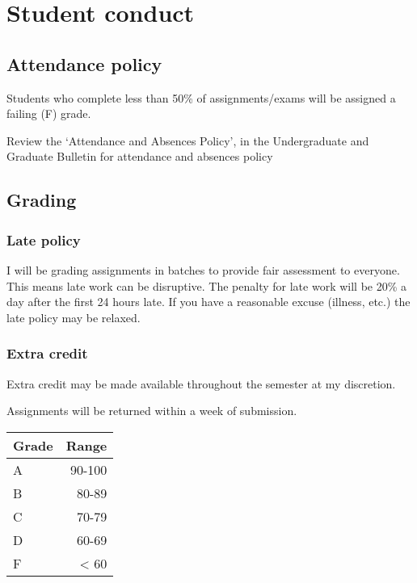 \documentclass[11pt,]{article}
\begin{document}
\newpage

\hypertarget{student-conduct}{%
\section{Student conduct}\label{student-conduct}}

\hypertarget{attendance-policy}{%
\subsection{Attendance policy}\label{attendance-policy}}

Students who complete less than 50\% of assignments/exams will be
assigned a failing (F) grade.

Review the `Attendance and Absences Policy', in the Undergraduate and
Graduate Bulletin for attendance and absences policy

\hypertarget{grading}{%
\subsection{Grading}\label{grading}}

\hypertarget{late-policy}{%
\subsubsection{Late policy}\label{late-policy}}

I will be grading assignments in batches to provide fair assessment to
everyone. This means late work can be disruptive. The penalty for late
work will be 20\% a day after the first 24 hours late. If you have a
reasonable excuse (illness, etc.) the late policy may be relaxed.

\hypertarget{extra-credit}{%
\subsubsection{Extra credit}\label{extra-credit}}

Extra credit may be made available throughout the semester at my
discretion.

Assignments will be returned within a week of submission.

\begin{tabular}{l|r}
\hline
Grade & Range\\
\hline
A & 90-100\\
\hline
B & 80-89\\
\hline
C & 70-79\\
\hline
D & 60-69\\
\hline
F & < 60\\
\hline
\end{tabular}
\end{document}
